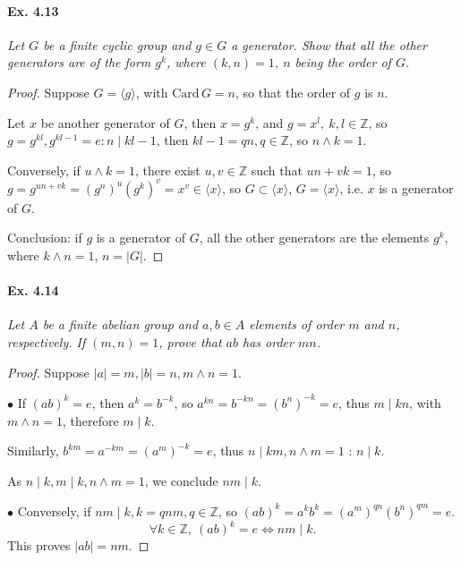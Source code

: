 \documentclass[11pt,a4paper]{article}
\newcommand{\Z}{\mathbb{Z}}
\begin{document}
\paragraph{Ex. 4.13}

{\it Let $G$ be a finite cyclic group and $g \in G$ a generator. Show that all the other generators are of the form $g^k$, where $(k, n) = 1$, $n$ being the order of $G$.
}

\begin{proof}
Suppose $G = \langle g \rangle$, with $\mathrm{Card}\, G = n$, so that the order of $g$ is $n$.

Let $x$ be another generator of $G$, then $x= g^k$, and $g = x^l, \ k,l \in \Z$, so $g = g^{kl}, g^{kl-1} = e : n \mid kl-1$, then $kl - 1 = qn, q\in \Z$, so $n\wedge k = 1$.

Conversely, if $u\wedge k = 1$, there exist $u,v \in \Z$ such that $un+vk=1$, so $g = g^{un+vk} = (g^n)^u(g^k)^v = x^v \in \langle x \rangle$, so $G \subset \langle x \rangle$, $G = \langle x \rangle$, i.e. $x$ is a generator of $G$.

Conclusion: if $g$ is a generator of $G$, all the other generators are the elements $g^k$, where $k \wedge n  = 1$, $n = \vert G \vert$.
\end{proof}

\paragraph{Ex. 4.14}

{\it Let $A$ be a finite abelian group and $a, b \in A$ elements of order $m$ and $n$, respectively.  If $(m, n) = 1$, prove that $ab$ has order $mn$.
}

\begin{proof}
Suppose $\vert a \vert = m, \vert b \vert = n, m\wedge n = 1$.

$\bullet$ If $(ab)^k = e$, then $a^k= b^{-k}$, so $a^{kn} = b^{-kn} = (b^n)^{-k} = e$, thus $m\mid kn$, with $m\wedge n = 1$, therefore $m \mid k$.

Similarly, $ b^{km} =a^{-km} = (a^m)^{-k} = e$, thus $n \mid km, n \wedge m = 1$ : $n \mid k$. 

As $n \mid k, m \mid k, n \wedge m = 1$, we conclude $nm \mid k$.

$\bullet$ Conversely, if $nm \mid k, k = qnm, q\in \Z$, so $(ab)^k = a^k b^k = (a^m)^{qn} (b^n)^{qm} = e$.
$$\forall k \in \Z,\ (ab)^k = e \iff nm \mid k.$$
This proves $\vert ab \vert = nm$.
\end{proof}
\end{document}
